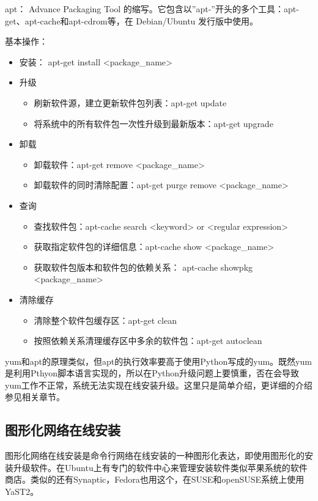 apt： Advance Packaging Tool 的缩写。它包含以''apt-''开头的多个工具：apt-get、apt-cache和apt-cdrom等，在 Debian/Ubuntu 发行版中使用。

基本操作：
\begin{itemize}
\item 安装： apt-get install <package\_name>
\item 升级
	\begin{itemize}
	\item 刷新软件源，建立更新软件包列表：apt-get update
	\item 将系统中的所有软件包一次性升级到最新版本：apt-get upgrade
	\end{itemize}
\item 卸载
	\begin{itemize}
	\item 卸载软件：apt-get remove <package\_name>
	\item 卸载软件的同时清除配置：apt-get purge remove  <package\_name>
	\end{itemize}
\item
查询
	\begin{itemize}
	\item	查找软件包：apt-cache search <keyword> or <regular expression>
	\item	获取指定软件包的详细信息：apt-cache show <package\_name>
	\item 	获取软件包版本和软件包的依赖关系： apt-cache showpkg <package\_name>
	\end{itemize} 
\item 清除缓存
	\begin{itemize}
	\item 	清除整个软件包缓存区：apt-get clean
	\item 	按照依赖关系清理缓存区中多余的软件包：apt-get autoclean
	\end{itemize} 
\end{itemize} 

yum和apt的原理类似，但apt的执行效率要高于使用Python写成的yum。既然yum是利用Pthyon脚本语言实现的，所以在Python升级问题上要慎重，否在会导致yum工作不正常，系统无法实现在线安装升级。这里只是简单介绍，更详细的介绍参见相关章节。



\subsection{图形化网络在线安装}
图形化网络在线安装是命令行网络在线安装的一种图形化表达，即使用图形化的安装升级软件。在Ubuntu上有专门的软件中心来管理安装软件类似苹果系统的软件商店。类似的还有Synaptic，Fedora也用这个，在SUSE和openSUSE系统上使用YaST2。




